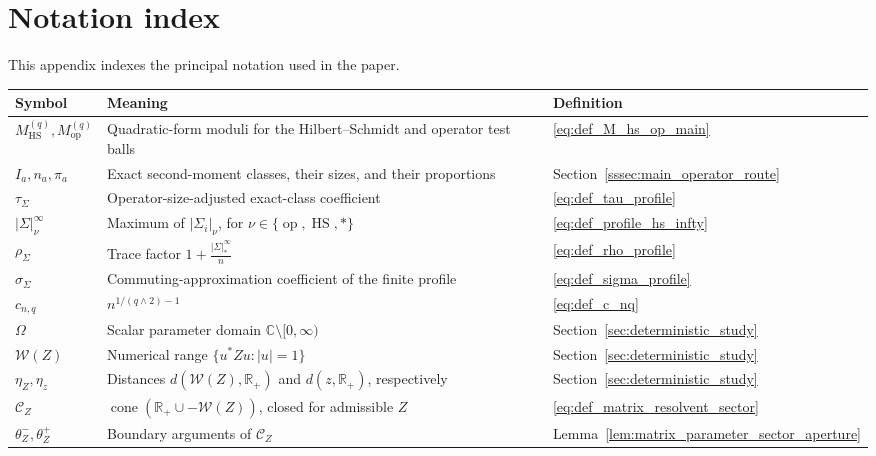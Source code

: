 \documentclass[EJP, preprint, NODS, nobera, nofontexpansion]{ejpecp}
\DeclareMathOperator{\op}{op}
\DeclareMathOperator{\cone}{cone}
\DeclareMathOperator{\hs}{HS}
\begin{document}
\clearpage
\appendix

\section{Notation index}
\label{sec:specific_notations_appendix}

This appendix indexes the principal notation used in the paper.

{\small
\setlength{\tabcolsep}{4pt}
\renewcommand{\arraystretch}{1.15}
\begin{longtable}{@{}
>{\raggedright\arraybackslash}p{}
>{\raggedright\arraybackslash}p{}
>{\raggedright\arraybackslash}p{}
@{}}
\hline
\textbf{Symbol} & \textbf{Meaning} & \textbf{Definition} \\
\hline
\endhead
\hline
\endfoot
$M_{\hs}^{(q)},M_{\op}^{(q)}$
& Quadratic-form moduli for the Hilbert--Schmidt and operator test balls
& \eqref{eq:def_M_hs_op_main} \\
$I_a,n_a,\pi_a$
& Exact second-moment classes, their sizes, and their proportions
& Section~\ref{sssec:main_operator_route} \\
$\tau_\Sigma$
& Operator-size-adjusted exact-class coefficient
& \eqref{eq:def_tau_profile} \\
$|\Sigma|_\nu^\infty$
& Maximum of $|\Sigma_i|_\nu$, for $\nu\in\{\op,\hs,*\}$
& \eqref{eq:def_profile_hs_infty} \\
$\rho_\Sigma$
& Trace factor $1+\frac{|\Sigma|_*^\infty}{n}$
& \eqref{eq:def_rho_profile} \\
$\sigma_\Sigma$
& Commuting-approximation coefficient of the finite profile
& \eqref{eq:def_sigma_profile} \\
$c_{n,q}$
& $n^{1/(q\wedge2)-1}$
& \eqref{eq:def_c_nq} \\
$\Omega$
& Scalar parameter domain $\mathbb C\setminus[0,\infty)$
& Section~\ref{sec:deterministic_study} \\
$\mathcal W(Z)$
& Numerical range $\{u^*Zu:|u|=1\}$
& Section~\ref{sec:deterministic_study} \\
$\eta_Z,\eta_z$
& Distances $d(\mathcal W(Z),\mathbb R_+)$
  and $d(z,\mathbb R_+)$, respectively
& Section~\ref{sec:deterministic_study} \\
$\mathcal C_Z$
& $\cone(\mathbb R_+\cup-\mathcal W(Z))$, closed for admissible $Z$
& \eqref{eq:def_matrix_resolvent_sector} \\
$\theta_Z^-,\theta_Z^+$
& Boundary arguments of $\mathcal C_Z$
& Lemma~\ref{lem:matrix_parameter_sector_aperture} \\

\end{longtable}}
\end{document}
